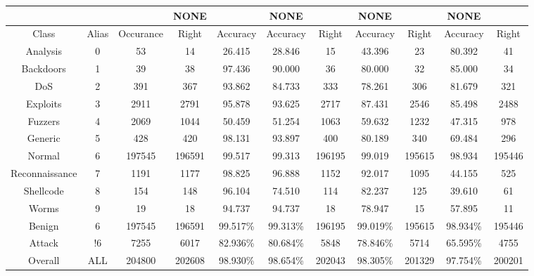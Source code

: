 \begin{table}[htb]
    \centering
    \begin{tabular}{@{}ccccccccccc@{}}
        \toprule
         &  &  & NONE &  & NONE &  & NONE &  & NONE &  \\
        \midrule
        Class &  Alias &  Occurance &  Right &  Accuracy &  Accuracy &  Right &  Accuracy &  Right &  Accuracy &  Right \\
        Analysis &  0 &  53 &  14 &  26.415 &  28.846 &  15 &  43.396 &  23 &  80.392 &  41 \\
        Backdoors &  1 &  39 &  38 &  97.436 &  90.000 &  36 &  80.000 &  32 &  85.000 &  34 \\
        DoS &  2 &  391 &  367 &  93.862 &  84.733 &  333 &  78.261 &  306 &  81.679 &  321 \\
        Exploits &  3 &  2911 &  2791 &  95.878 &  93.625 &  2717 &  87.431 &  2546 &  85.498 &  2488 \\
        Fuzzers &  4 &  2069 &  1044 &  50.459 &  51.254 &  1063 &  59.632 &  1232 &  47.315 &  978 \\
        Generic &  5 &  428 &  420 &  98.131 &  93.897 &  400 &  80.189 &  340 &  69.484 &  296 \\
        Normal &  6 &  197545 &  196591 &  99.517 &  99.313 &  196195 &  99.019 &  195615 &  98.934 &  195446 \\
        Reconnaissance &  7 &  1191 &  1177 &  98.825 &  96.888 &  1152 &  92.017 &  1095 &  44.155 &  525 \\
        Shellcode &  8 &  154 &  148 &  96.104 &  74.510 &  114 &  82.237 &  125 &  39.610 &  61 \\
        Worms &  9 &  19 &  18 &  94.737 &  94.737 &  18 &  78.947 &  15 &  57.895 &  11 \\
        Benign &  6 &  197545 &  196591 &  99.517\% &  99.313\% &  196195 &  99.019\% &  195615 &  98.934\% &  195446 \\
        Attack &  !6 &  7255 &  6017 &  82.936\% &  80.684\% &  5848 &  78.846\% &  5714 &  65.595\% &  4755 \\
        Overall &  ALL &  204800 &  202608 &  98.930\% &  98.654\% &  202043 &  98.305\% &  201329 &  97.754\% &  200201 \\
        \bottomrule
    \end{tabular}
\end{table}
